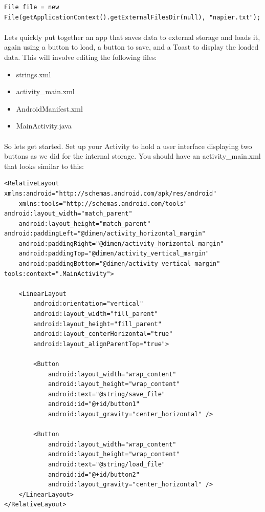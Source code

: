 \begin{lstlisting}
File file = new File(getApplicationContext().getExternalFilesDir(null), "napier.txt");
\end{lstlisting}

\paragraph{} Lets quickly put together an app that saves data to external storage and loads it, again using a button to load, a button to save, and a Toast to display the loaded data. This will involve editing the following files:

\begin{itemize}
\item strings.xml
\item activity\_main.xml
\item AndroidManifest.xml
\item MainActivity.java
\end{itemize}

\paragraph{} So lets get started. Set up your Activity to hold a user interface displaying two buttons as we did for the internal storage. You should have an activity\_main.xml that looks similar to this:

\begin{lstlisting}
<RelativeLayout xmlns:android="http://schemas.android.com/apk/res/android"
    xmlns:tools="http://schemas.android.com/tools" android:layout_width="match_parent"
    android:layout_height="match_parent" android:paddingLeft="@dimen/activity_horizontal_margin"
    android:paddingRight="@dimen/activity_horizontal_margin"
    android:paddingTop="@dimen/activity_vertical_margin"
    android:paddingBottom="@dimen/activity_vertical_margin" tools:context=".MainActivity">

    <LinearLayout
        android:orientation="vertical"
        android:layout_width="fill_parent"
        android:layout_height="fill_parent"
        android:layout_centerHorizontal="true"
        android:layout_alignParentTop="true">

        <Button
            android:layout_width="wrap_content"
            android:layout_height="wrap_content"
            android:text="@string/save_file"
            android:id="@+id/button1"
            android:layout_gravity="center_horizontal" />

        <Button
            android:layout_width="wrap_content"
            android:layout_height="wrap_content"
            android:text="@string/load_file"
            android:id="@+id/button2"
            android:layout_gravity="center_horizontal" />
    </LinearLayout>
</RelativeLayout>

\end{lstlisting}


